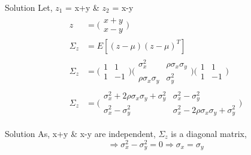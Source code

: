 \documentclass{beamer}
\begin{document}
\begin{frame}{Solution}
        Let, $z_1$ = x+y \& $z_2$ = x-y \\
        \begin{align}
            z &= \Bigg(\begin{matrix}
                x+y\\
                x-y
            \end{matrix}\Bigg)\\
            \Sigma_z &= E[(z-\mu)(z-\mu)^T]\\
            \Sigma_z &= \Bigg(\begin{matrix}
                1 &1\\
                1 &-1
            \end{matrix}\Bigg)\Bigg(\begin{matrix}
                \sigma_x^2 &\rho \sigma_x \sigma_y \\
                \rho \sigma_x \sigma_y &\sigma_y^2
            \end{matrix}\Bigg)\Bigg(\begin{matrix}
                1 &1\\
                1 &-1
            \end{matrix}\Bigg)\\
            \Sigma_z &= \Bigg(\begin{matrix}
                \sigma_x^2+2\rho \sigma_x \sigma_y+\sigma_y^2 &\sigma_x^2-\sigma_y^2\\
                \sigma_x^2-\sigma_y^2 &\sigma_x^2-2\rho \sigma_x \sigma_y+\sigma_y^2
            \end{matrix}\Bigg)
        \end{align}
\end{frame}
\begin{frame}{Solution}
    As, x+y \& x-y are independent, $\Sigma_z$ is a diagonal matrix,
    \begin{equation}
        \Rightarrow \sigma_x^2 - \sigma_y^2 = 0
        \Rightarrow \sigma_x = \sigma_y
    \end{equation}
\end{frame}
\end{document}
